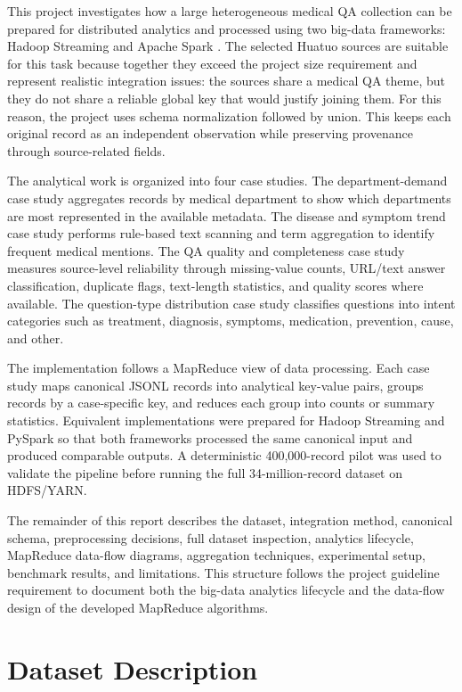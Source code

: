 \documentclass[12pt,a4paper]{article}
\let\oldsection\section
\renewcommand{\section}{\clearpage\oldsection}
\begin{document}
This project investigates how a large heterogeneous medical QA collection can be prepared for distributed analytics and processed using two big-data frameworks: Hadoop Streaming \cite{hadoop} and Apache Spark \cite{spark}. The selected Huatuo sources are suitable for this task because together they exceed the project size requirement and represent realistic integration issues: the sources share a medical QA theme, but they do not share a reliable global key that would justify joining them. For this reason, the project uses schema normalization followed by union. This keeps each original record as an independent observation while preserving provenance through source-related fields.

The analytical work is organized into four case studies. The department-demand case study aggregates records by medical department to show which departments are most represented in the available metadata. The disease and symptom trend case study performs rule-based text scanning and term aggregation to identify frequent medical mentions. The QA quality and completeness case study measures source-level reliability through missing-value counts, URL/text answer classification, duplicate flags, text-length statistics, and quality scores where available. The question-type distribution case study classifies questions into intent categories such as treatment, diagnosis, symptoms, medication, prevention, cause, and other.

The implementation follows a MapReduce view of data processing. Each case study maps canonical JSONL records into analytical key-value pairs, groups records by a case-specific key, and reduces each group into counts or summary statistics. Equivalent implementations were prepared for Hadoop Streaming and PySpark so that both frameworks processed the same canonical input and produced comparable outputs. A deterministic 400,000-record pilot was used to validate the pipeline before running the full 34-million-record dataset on HDFS/YARN.

The remainder of this report describes the dataset, integration method, canonical schema, preprocessing decisions, full dataset inspection, analytics lifecycle, MapReduce data-flow diagrams, aggregation techniques, experimental setup, benchmark results, and limitations. This structure follows the project guideline requirement to document both the big-data analytics lifecycle and the data-flow design of the developed MapReduce algorithms.

\section{Dataset Description}
\end{document}
